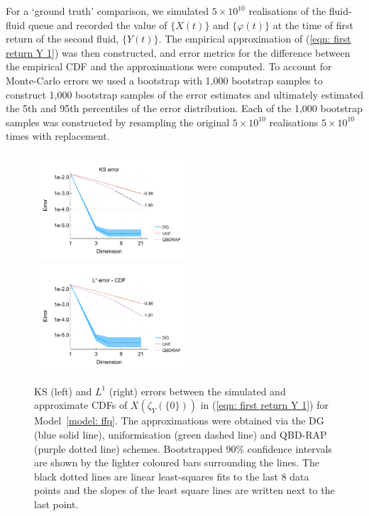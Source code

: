 For a `ground truth' comparison, we simulated \(5\times 10^{10}\) realisations of the fluid-fluid queue and recorded the value of \(\{X(t)\}\) and \(\{\varphi(t)\}\) at the time of first return of the second fluid, \(\{Y(t)\}\). The empirical approximation of (\ref{eqn: first return Y 1}) was then constructed, and error metrics for the difference between the empirical CDF and the approximations were computed. To account for Monte-Carlo errors we used a bootstrap with 1,000 bootstrap samples to construct 1,000 bootstrap samples of the error estimates and ultimately estimated the 5th and 95th percentiles of the error distribution. Each of the 1,000 bootstrap samples was constructed by resampling the original \(5\times 10^{10}\) realisations \(5\times 10^{10}\) times with replacement.

\begin{figure}[h]
	\centering
	\includegraphics[width=0.5\textwidth,trim={0.75cm 0.8cm 0.25cm 1.25cm},clip]{chapter6/figs/ffq/cts/ks_error_formatted.pdf}%
	\includegraphics[width=0.5\textwidth,trim={0.75cm 0.8cm 0.25cm 1.25cm},clip]{chapter6/figs/ffq/cts/l1_cdf_error_formatted.pdf}
	\caption{KS (left) and \(L^1\) (right) errors between the simulated and approximate CDFs of \(X(\zeta_{Y}(\{0\}))\) in (\ref{eqn: first return Y 1}) for Model~\ref{model: ffq}. The approximations were obtained via the DG (blue solid line), uniformisation (green dashed line) and QBD-RAP (purple dotted line) schemes. Bootstrapped 90\% confidence intervals are shown by the lighter coloured bars surrounding the lines. The black dotted lines are linear least-squares fits to the last 8 data points and the slopes of the least square lines are written next to the last point.} 
	\label{fig: ffq return cts} 
\end{figure}

